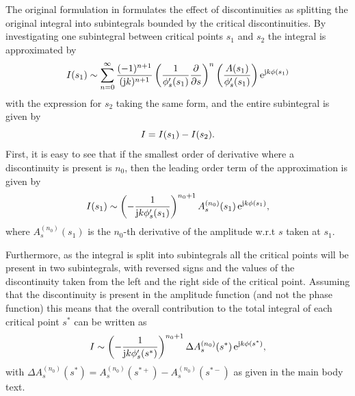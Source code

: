 \label{app:diff}

The original formulation in \cite[Eq. 2.6.11]{Bleistein1984} formulates the effect of discontinuities as splitting the original integral into subintegrals bounded by the critical discontinuities.
By investigating one subintegral between critical points $s_1$ and $s_2$ the integral is approximated by 
\begin{equation}
    \small
    I(s_1) \sim  \sum_{n = 0}^{\infty} \frac{(-1)^{n+1}}{(\mathrm{j} k)^{n+1}} \left( \frac{1}{\phi'_s(s_1)} \frac{\partial}{\partial s}\right)^{n} \left( \frac{A(s_1)}{\phi'_s(s_1)} \right) \mathrm{e}^{\mathrm{j} k \phi(s_1)}
\end{equation}
with the expression for $s_2$ taking the same form, and the entire subintegral is given by
\begin{equation}
    \small
    I = I(s_1) - I(s_2).
\end{equation}
First, it is easy to see that if the smallest order of derivative where a discontinuity is present is $n_0$, then the leading order term of the approximation is given by
\begin{equation}
    \small
    I(s_1) \sim \left( -\frac{1}{\mathrm{j} k \phi'_s(s_1)} \right)^{n_0+1}  A_{s}^{(n_0)}(s_1) \, \mathrm{e}^{\mathrm{j} k \phi(s_1)},
\end{equation}
where $A_{s}^{(n_0)}(s_1)$ is the $n_0$-th derivative of the amplitude w.r.t $s$ taken at $s_1$.

Furthermore, as the integral is split into subintegrals all the critical points will be present in two subintegrals, with reversed signs and the values of the discontinuity taken from the left and the right side of the critical point.
Assuming that the discontinuity is present in the amplitude function (and not the phase function) this means that the overall contribution to the total integral of each critical point $s^*$ can be written as
\begin{equation}
    \small
    I \sim \left( -\frac{1}{\mathrm{j} k \phi'_s(s^*)} \right)^{n_0+1}  \Delta A_{s}^{(n_0)}(s^*) \, \mathrm{e}^{\mathrm{j} k \phi(s^*)},
\end{equation}
with $\Delta A_{s}^{(n_0)}(s^*) = A_{s}^{(n_0)}(s^{*+})  - A_{s}^{(n_0)}(s^{*-})  $ as given in the main body text.